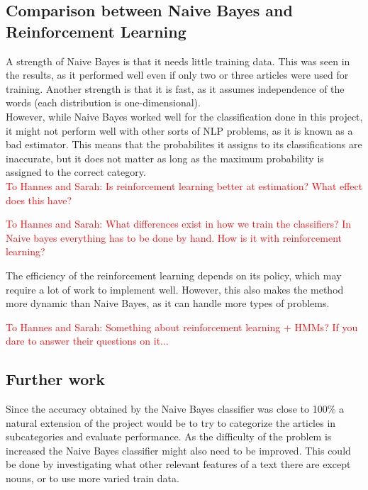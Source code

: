 \documentclass[a4paper]{article}
\begin{document}
\subsection{Comparison between Naive Bayes and Reinforcement Learning}

A strength of Naive Bayes is that it needs little training data\cite{NBtrainsize}. This was seen in the results, as it performed well even if only two or three articles were used for training. Another strength is that it is fast, as it assumes independence\cite{NBfast} of the words (each distribution is one-dimensional).\\

\noindent However, while Naive Bayes worked well for the classification done in this project, it might not perform well with other sorts of NLP problems, as it is known as a bad estimator. This means that the probabilites it assigns to its classifications are inaccurate, but it does not matter as long as the maximum probability is assigned to the correct category\cite{NBestimation}.\\

\textcolor{red}{To Hannes and Sarah: Is reinforcement learning better at estimation? What effect does this have?}

\textcolor{red}{To Hannes and Sarah: What differences exist in how we train the classifiers? In Naive bayes everything has to be done by hand. How is it with reinforcement learning?}

\noindent The efficiency of the reinforcement learning depends on its policy, which may require a lot of work to implement well. However, this also makes the method more dynamic than Naive Bayes, as it can handle more types of problems.

\textcolor{red}{To Hannes and Sarah: Something about reinforcement learning + HMMs? If you dare to answer their questions on it...}

\subsection{Further work}
Since the accuracy obtained by the Naive Bayes classifier was close to 100\% a natural extension of the project would be to try to categorize the articles in subcategories and evaluate performance. As the difficulty of the problem is increased the Naive Bayes classifier might also need to be improved. This could be done by investigating what other relevant features of a text there are except nouns, or to use more varied train data. 
\end{document}

